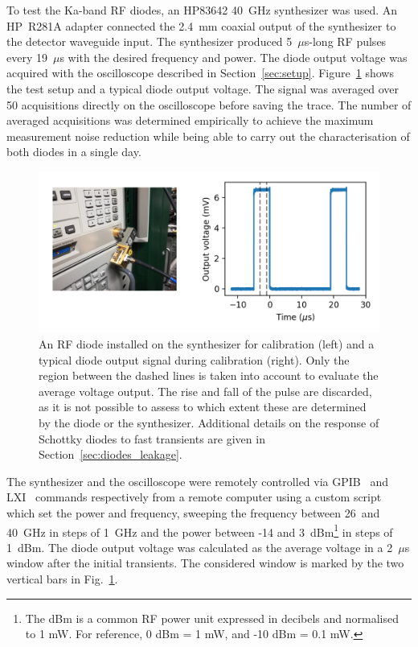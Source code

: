To test the Ka-band RF diodes, an HP83642 40~GHz synthesizer was used. An HP~R281A adapter connected the 2.4~mm coaxial output of the synthesizer to the detector waveguide input. The synthesizer produced 5~$\mu$s-long RF pulses every 19~$\mu$s with the desired frequency and power. The diode output voltage was acquired with the oscilloscope described in Section~\ref{sec:setup}. Figure~\ref{fig:diode_cal_setup} shows the test setup and a typical diode output voltage. The signal was averaged over 50 acquisitions directly on the oscilloscope before saving the trace. The number of averaged acquisitions was determined empirically to achieve the maximum measurement noise reduction while being able to carry out the characterisation of both diodes in a single day. 

\begin{figure}[!t]
\centering
\includegraphics[scale=1,keepaspectratio]{pictures/diode_cal_single}
\caption{An RF diode installed on the synthesizer for calibration (left) and a typical diode output signal during calibration (right). Only the region between the dashed lines is taken into account to evaluate the average voltage output. The rise and fall of the pulse are discarded, as it is not possible to assess to which extent these are determined by the diode or the synthesizer. Additional details on the response of Schottky diodes to fast transients are given in Section~\ref{sec:diodes_leakage}.}
\label{fig:diode_cal_setup}
\end{figure}

The synthesizer and the oscilloscope were remotely controlled via GPIB~\cite{GPIB} and LXI~\cite{LXI} commands respectively from a remote computer using a custom script which set the power and frequency, sweeping the frequency between 26~and 40~GHz in steps of 1~GHz and the power between -14 and 3~dBm\footnote{The dBm is a common RF power unit expressed in decibels and normalised to 1 mW. For reference, 0 dBm = 1 mW, and -10 dBm = 0.1 mW.} in steps of 1~dBm. The diode output voltage was calculated as the average voltage in a 2~$\mu$s window after the initial transients. The considered window is marked by the two vertical bars in Fig.~\ref{fig:diode_cal_setup}. 




